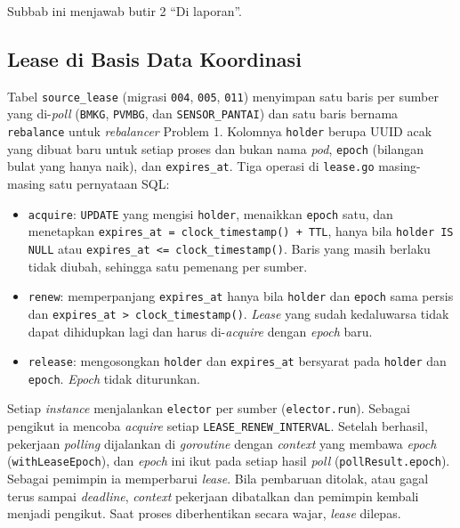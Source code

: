 Subbab ini menjawab butir 2 ``Di laporan''.

\subsection{Lease di Basis Data Koordinasi}

Tabel \texttt{source\_lease} (migrasi \texttt{004}, \texttt{005}, \texttt{011}) menyimpan satu baris per sumber yang di-\textit{poll} (\texttt{BMKG}, \texttt{PVMBG}, dan \texttt{SENSOR\_PANTAI}) dan satu baris bernama \texttt{rebalance} untuk \textit{rebalancer} Problem 1. Kolomnya \texttt{holder} berupa UUID acak yang dibuat baru untuk setiap proses dan bukan nama \textit{pod}, \texttt{epoch} (bilangan bulat yang hanya naik), dan \texttt{expires\_at}. Tiga operasi di \texttt{lease.go} masing-masing satu pernyataan SQL:

\begin{itemize}
\item \texttt{acquire}: \texttt{UPDATE} yang mengisi \texttt{holder}, menaikkan \texttt{epoch} satu, dan menetapkan \texttt{expires\_at = clock\_timestamp() + TTL}, hanya bila \texttt{holder IS NULL} atau \texttt{expires\_at <= clock\_timestamp()}. Baris yang masih berlaku tidak diubah, sehingga satu pemenang per sumber.
\item \texttt{renew}: memperpanjang \texttt{expires\_at} hanya bila \texttt{holder} dan \texttt{epoch} sama persis dan \texttt{expires\_at > clock\_timestamp()}. \textit{Lease} yang sudah kedaluwarsa tidak dapat dihidupkan lagi dan harus di-\textit{acquire} dengan \textit{epoch} baru.
\item \texttt{release}: mengosongkan \texttt{holder} dan \texttt{expires\_at} bersyarat pada \texttt{holder} dan \texttt{epoch}. \textit{Epoch} tidak diturunkan.
\end{itemize}

Setiap \textit{instance} menjalankan \texttt{elector} per sumber (\texttt{elector.run}). Sebagai pengikut ia mencoba \textit{acquire} setiap \texttt{LEASE\_RENEW\_INTERVAL}. Setelah berhasil, pekerjaan \textit{polling} dijalankan di \textit{goroutine} dengan \textit{context} yang membawa \textit{epoch} (\texttt{withLeaseEpoch}), dan \textit{epoch} ini ikut pada setiap hasil \textit{poll} (\texttt{pollResult.epoch}). Sebagai pemimpin ia memperbarui \textit{lease}. Bila pembaruan ditolak, atau gagal terus sampai \textit{deadline}, \textit{context} pekerjaan dibatalkan dan pemimpin kembali menjadi pengikut. Saat proses diberhentikan secara wajar, \textit{lease} dilepas.

